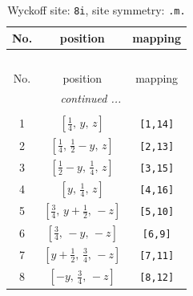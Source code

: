 \documentclass[fleqn,8pt]{jsarticle}
\begin{document}
\begin{longtable}{ccc}
\caption{Wyckoff site: {\tt 8i}, site symmetry: {\tt .m.}}
 \\
 \hline \hline
No. & position & mapping \\ \hline \endfirsthead

\multicolumn{2}{l}{\tablename\ \thetable{}} \\
 \hline \hline
No. & position & mapping \\ \hline \endhead

 \hline \hline
\multicolumn{2}{r}{\footnotesize\it continued ...} \\ \endfoot

 \hline \hline
\multicolumn{2}{r}{} \\ \endlastfoot

1 & $\left[ \frac{1}{4},\, y,\, z \right]$ & {\tt [1,14]} \\ \hline
2 & $\left[ \frac{1}{4},\, \frac{1}{2} - y,\, z \right]$ & {\tt [2,13]} \\ \hline
3 & $\left[ \frac{1}{2} - y,\, \frac{1}{4},\, z \right]$ & {\tt [3,15]} \\ \hline
4 & $\left[ y,\, \frac{1}{4},\, z \right]$ & {\tt [4,16]} \\ \hline
5 & $\left[ \frac{3}{4},\, y + \frac{1}{2},\, - z \right]$ & {\tt [5,10]} \\ \hline
6 & $\left[ \frac{3}{4},\, - y,\, - z \right]$ & {\tt [6,9]} \\ \hline
7 & $\left[ y + \frac{1}{2},\, \frac{3}{4},\, - z \right]$ & {\tt [7,11]} \\ \hline
8 & $\left[ - y,\, \frac{3}{4},\, - z \right]$ & {\tt [8,12]} \\
\end{longtable}
\renewcommand{\arraystretch}{1.2}
\end{document}
